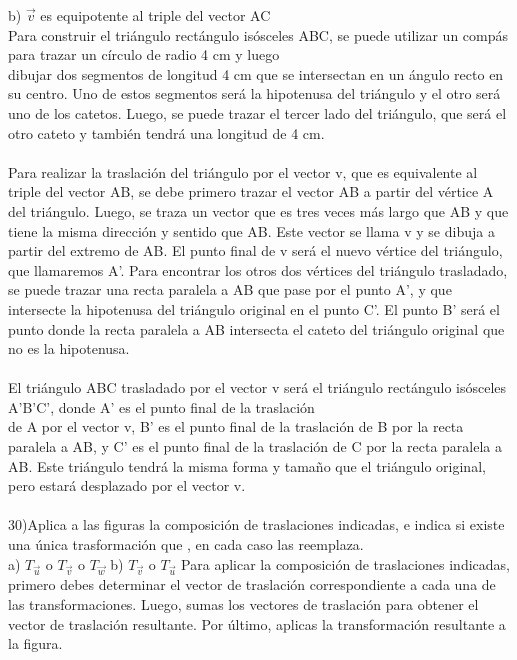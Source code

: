 \documentclass{article}
\begin{document}
b) $\vec{v}$ es equipotente al triple del vector AC\\
Para construir el triángulo rectángulo isósceles ABC, se puede utilizar un compás para trazar un círculo de radio 4 cm y luego\\
dibujar dos segmentos de longitud 4 cm que se intersectan en un ángulo recto en su centro. Uno de estos segmentos será la hipotenusa del triángulo y el otro será uno de los catetos. Luego, se puede trazar el tercer lado del triángulo, que será el otro cateto y también tendrá una longitud de 4 cm.\\
\\
Para realizar la traslación del triángulo por el vector v, que es equivalente al triple del vector AB, se debe primero trazar el vector AB a partir del vértice A del triángulo. Luego, se traza un vector que es tres veces más largo que AB y que tiene la misma dirección y sentido que AB. Este vector se llama v y se dibuja a partir del extremo de AB. El punto final de v será el nuevo vértice del triángulo, que llamaremos A'. Para encontrar los otros dos vértices del triángulo trasladado, se puede trazar una recta paralela a AB que pase por el punto A', y que intersecte la hipotenusa del triángulo original en el punto C'. El punto B' será el punto donde la recta paralela a AB intersecta el cateto del triángulo original que no es la hipotenusa.\\
\\
El triángulo ABC trasladado por el vector v será el triángulo rectángulo isósceles A'B'C', donde A' es el punto final de la traslación\\
de A por el vector v, B' es el punto final de la traslación de B por la recta paralela a AB, y C' es el punto final de la traslación de C por la recta paralela a AB. Este triángulo tendrá la misma forma y tamaño que el triángulo original, pero estará desplazado por el vector v.\\
\\

30)Aplica a las figuras la composición de traslaciones indicadas, e indica si existe una única trasformación que , en cada caso las reemplaza. \\
a) $T_{\vec{u}}$ o $T_{\vec{v}}$ o $T_{\vec{w}}$
b) $T_{\vec{v}}$ o $T_{\vec{u}}$ 
Para aplicar la composición de traslaciones indicadas, primero debes determinar el vector de traslación correspondiente a cada
una de las transformaciones. Luego, sumas los vectores de traslación para obtener el vector de traslación resultante. Por último, aplicas la transformación resultante a la figura.
\end{document}
